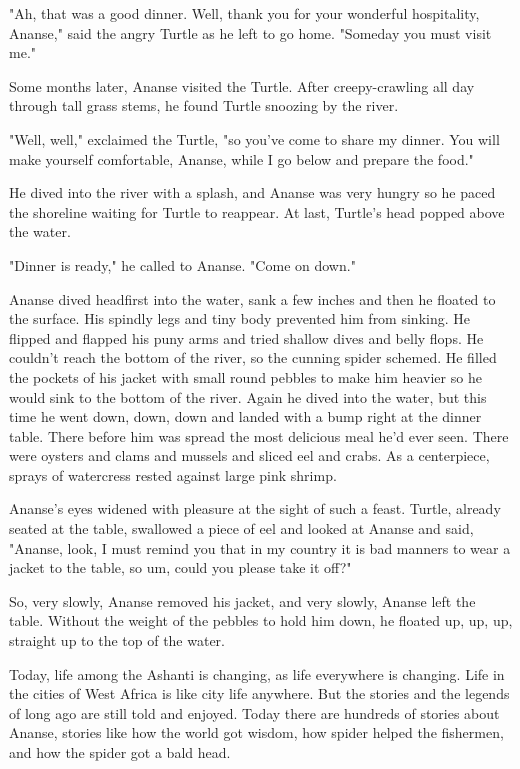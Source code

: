 "Ah, that was a good dinner. Well, thank you for your wonderful hospitality, Ananse," said the angry Turtle as he left to go home. "Someday you must visit me."

Some months later, Ananse visited the Turtle. After creepy-crawling all day through tall grass stems, he found Turtle snoozing by the river.

"Well, well," exclaimed the Turtle, "so you've come to share my dinner. You will make yourself comfortable, Ananse, while I go below and prepare the food."

He dived into the river with a splash, and Ananse was very hungry so he paced the shoreline waiting for Turtle to reappear. At last, Turtle's head popped above the water.

"Dinner is ready," he called to Ananse. "Come on down."

Ananse dived headfirst into the water, sank a few inches and then he floated to the surface. His spindly legs and tiny body prevented him from sinking. He flipped and flapped his puny arms and tried shallow dives and belly flops. He couldn't reach the bottom of the river, so the cunning spider schemed. He filled the pockets of his jacket with small round pebbles to make him heavier so he would sink to the bottom of the river. Again he dived into the water, but this time he went down, down, down and landed with a bump right at the dinner table. There before him was spread the most delicious meal he'd ever seen. There were oysters and clams and mussels and sliced eel and crabs. As a centerpiece, sprays of watercress rested against large pink shrimp.

Ananse's eyes widened with pleasure at the sight of such a feast. Turtle, already seated at the table, swallowed a piece of eel and looked at Ananse and said, "Ananse, look, I must remind you that in my country it is bad manners to wear a jacket to the table, so um, could you please take it off?"

So, very slowly, Ananse removed his jacket, and very slowly, Ananse left the table. Without the weight of the pebbles to hold him down, he floated up, up, up, straight up to the top of the water.

Today, life among the Ashanti is changing, as life everywhere is changing. Life in the cities of West Africa is like city life anywhere. But the stories and the legends of long ago are still told and enjoyed. Today there are hundreds of stories about Ananse, stories like how the world got wisdom, how spider helped the fishermen, and how the spider got a bald head.

